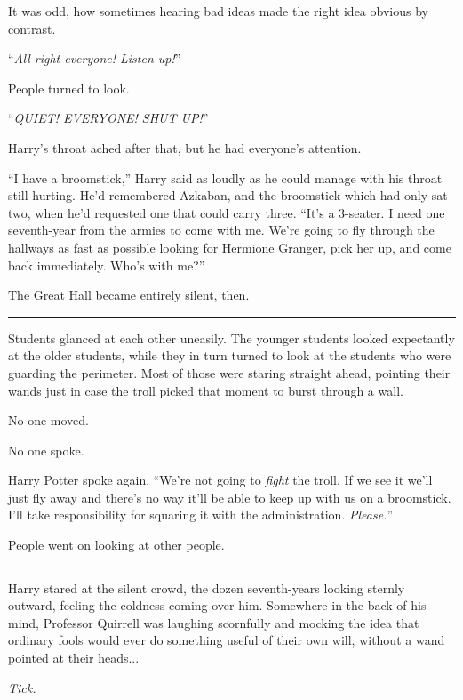 It was odd, how sometimes hearing bad ideas made the right idea obvious by contrast.

``\emph{All right everyone! Listen up!}''

People turned to look.

``\emph{QUIET! EVERYONE! SHUT UP!}''

Harry's throat ached after that, but he had everyone's attention.

``I have a broomstick,'' Harry said as loudly as he could manage with his throat still hurting. He'd remembered Azkaban, and the broomstick which had only sat two, when he'd requested one that could carry three. ``It's a 3-seater. I need one seventh-year from the armies to come with me. We're going to fly through the hallways as fast as possible looking for Hermione Granger, pick her up, and come back immediately. Who's with me?''

The Great Hall became entirely silent, then.

\begin{center}\rule{3in}{0.4pt}\end{center}

Students glanced at each other uneasily. The younger students looked expectantly at the older students, while they in turn turned to look at the students who were guarding the perimeter. Most of those were staring straight ahead, pointing their wands just in case the troll picked that moment to burst through a wall.

No one moved.

No one spoke.

Harry Potter spoke again. ``We're not going to \emph{fight} the troll. If we see it we'll just fly away and there's no way it'll be able to keep up with us on a broomstick. I'll take responsibility for squaring it with the administration. \emph{Please.}''

People went on looking at other people.

\begin{center}\rule{3in}{0.4pt}\end{center}

Harry stared at the silent crowd, the dozen seventh-years looking sternly outward, feeling the coldness coming over him. Somewhere in the back of his mind, Professor Quirrell was laughing scornfully and mocking the idea that ordinary fools would ever do something useful of their own will, without a wand pointed at their heads...

\emph{Tick.}

